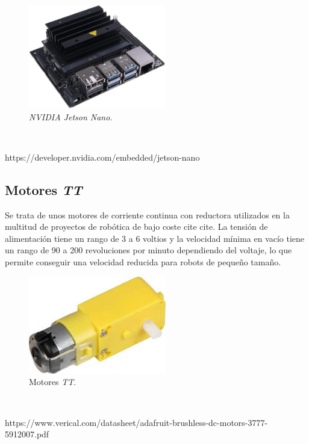 \begin{figure} [h!]
	\begin{center}
		\includegraphics[width=6cm]{figs/jetsonnano}
	\end{center}
	\caption{\textit{NVIDIA Jetson Nano}.}
	\label{fig:jetsonnano}
\end{figure}\

https://developer.nvidia.com/embedded/jetson-nano

\subsection{Motores \textit{TT}}
Se trata de unos motores de corriente continua con reductora utilizados en la multitud de proyectos de robótica de bajo coste cite cite. La tensión de alimentación tiene un rango de 3 a 6 voltios y la velocidad mínima en vacío tiene un rango de 90 a 200 revoluciones por minuto dependiendo del voltaje, lo que permite conseguir una velocidad reducida para robots de pequeño tamaño.\\ 

\begin{figure} [h!]
	\begin{center}
		\includegraphics[width=6cm]{figs/motorTT}
	\end{center}
	\caption{Motores \textit{TT}.}
	\label{fig:motorTT}
\end{figure}\

https://www.verical.com/datasheet/adafruit-brushless-dc-motors-3777-5912007.pdf


